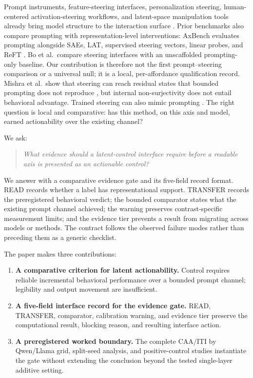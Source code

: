 \documentclass[sigconf]{acmart}
\begin{document}
Prompt instruments, feature-steering interfaces, personalization steering, human-centered activation-steering workflows, and latent-space manipulation tools already bring model structure to the interaction surface \cite{riche2025aiinstr,huang2025steering,bo2026steerable,labarta2026attribution,raval2026latman}. Prior benchmarks also compare prompting with representation-level interventions: AxBench evaluates prompting alongside SAEs, LAT, supervised steering vectors, linear probes, and ReFT \cite{wu2025axbench}. Bo et al.\ compare steering interfaces with an unscaffolded prompting-only baseline. Our contribution is therefore not the first prompt--steering comparison or a universal null; it is a local, per-affordance qualification record. Mishra et al.\ show that steering can reach residual states that bounded prompting does not reproduce \cite{mishra2026nonsurj}, but internal non-surjectivity does not entail behavioral advantage. Trained steering can also mimic prompting \cite{heyman2026steer}. The right question is local and comparative: has this method, on this axis and model, earned actionability over the existing channel?

We ask:
\begin{quote}
\emph{What evidence should a latent-control interface require before a readable axis is presented as an actionable control?}
\end{quote}
We answer with a comparative evidence gate and its five-field record format. READ records whether a label has representational support. TRANSFER records the preregistered behavioral verdict; the bounded comparator states what the existing prompt channel achieved; the warning preserves contrast-specific measurement limits; and the evidence tier prevents a result from migrating across models or methods. The contract follows the observed failure modes rather than preceding them as a generic checklist.

The paper makes three contributions:
\begin{enumerate}
  \item \textbf{A comparative criterion for latent actionability.} Control requires reliable incremental behavioral performance over a bounded prompt channel; legibility and output movement are insufficient.
  \item \textbf{A five-field interface record for the evidence gate.} READ, TRANSFER, comparator, calibration warning, and evidence tier preserve the computational result, blocking reason, and resulting interface action.
  \item \textbf{A preregistered worked boundary.} The complete CAA/ITI by Qwen/Llama grid, split-seed analysis, and positive-control studies instantiate the gate without extending the conclusion beyond the tested single-layer additive setting.
\end{enumerate}
\end{document}
